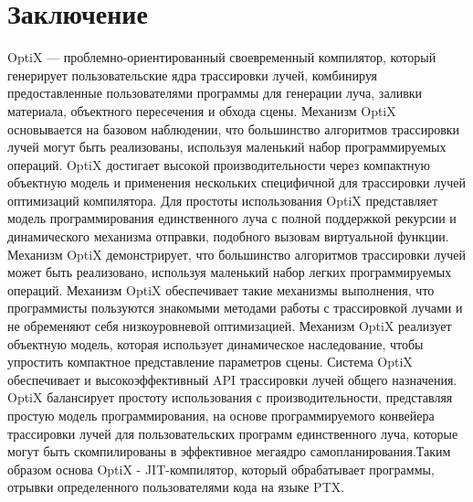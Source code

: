 \section{Заключение}

OptiX --- проблемно-ориентированный своевременный компилятор, который генерирует пользовательские ядра трассировки лучей, комбинируя предоставленные пользователями программы для генерации луча, заливки материала, объектного пересечения и обхода сцены. Механизм OptiX основывается на базовом наблюдении, что большинство алгоритмов трассировки лучей могут быть реализованы, используя маленький набор программируемых операций. OptiX достигает высокой производительности через компактную объектную модель и применения нескольких специфичной для трассировки лучей оптимизаций компилятора. 
Для простоты использования OptiX представляет модель программирования единственного луча с полной поддержкой рекурсии и динамического механизма отправки, подобного вызовам виртуальной функции. Механизм OptiX демонстрирует, что большинство алгоритмов трассировки лучей может быть реализовано, используя маленький набор легких программируемых операций. Механизм OptiX обеспечивает такие механизмы выполнения, что программисты пользуются знакомыми методами работы с трассировкой лучами и  не обременяют себя низкоуровневой оптимизацией. Механизм OptiX реализует объектную модель, которая использует динамическое наследование, чтобы упростить компактное представление параметров сцены. Система OptiX обеспечивает и высокоэффективный API трассировки лучей общего назначения. OptiX балансирует простоту использования с производительности, представляя простую модель программирования, на основе программируемого конвейера трассировки лучей для пользовательских программ единственного луча, которые могут быть скомпилированы в эффективное мегаядро самопланирования.Таким образом основа OptiX - JIT-компилятор, который обрабатывает программы, отрывки определенного пользователями кода на языке PTX.
